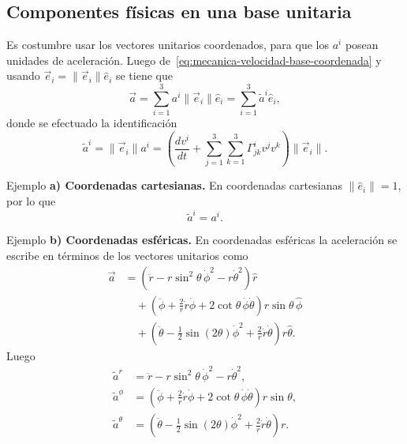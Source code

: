 \documentclass[../apunte_mecanica_clasica.tex]{subfiles}%
\begin{document}
\subsection{Componentes físicas en una base unitaria}

Es costumbre usar los vectores unitarios coordenados, para que los $a^i$ posean unidades de aceleración. Luego de~\eqref{eq:mecanica-velocidad-base-coordenada} y usando $\vec e_i=\|\vec e_i\|\hat e_i$ se tiene que
\begin{equation*}
    \vec a=\sum_{i=1}^{3}a^i\|\vec e_i\|\hat e_i=\sum_{i=1}^{3}\widetilde a^i\hat e_i,
\end{equation*}
donde se efectuado la identificación
\begin{equation}
    \widetilde a^i=\|\vec e_i\|a^i
    =\left(\frac{dv^i}{dt}+\sum_{j=1}^{3}\sum_{k=1}^{3}\Gamma^{i}_{jk}v^jv^k\right)\|\vec e_i\|.
    \label{eq:mecanica-componentes-aceleracion-unitaria}
\end{equation}

\begin{apuntebloque}{Ejemplo}
\textbf{a) Coordenadas cartesianas.} En coordenadas cartesianas $\|\hat e_i\|=1$, por lo que
\begin{equation*}
    \widetilde a^i=a^i.
\end{equation*}
\end{apuntebloque}

\begin{apuntebloque}{Ejemplo}
\textbf{b) Coordenadas esféricas.} En coordenadas esféricas la aceleración se escribe en términos de los vectores unitarios como
\begin{align*}
    \vec a
    &=\left(\ddot r-r\sin^2\theta\,\dot\phi^2-r\dot\theta^2\right)\hat r \\
    &\quad+
    \left(\ddot\phi+\frac{2}{r}\dot r\dot\phi+2\cot\theta\,\dot\phi\dot\theta\right)r\sin\theta\,\hat\phi \\
    &\quad+
    \left(\ddot\theta-\frac{1}{2}\sin(2\theta)\dot\phi^2+\frac{2}{r}\dot r\dot\theta\right)r\hat\theta.
\end{align*}
Luego
\begin{align*}
    \widetilde a^r&=\ddot r-r\sin^2\theta\,\dot\phi^2-r\dot\theta^2,\\
    \widetilde a^\phi&=\left(\ddot\phi+\frac{2}{r}\dot r\dot\phi+2\cot\theta\,\dot\phi\dot\theta\right)r\sin\theta,\\
    \widetilde a^\theta&=\left(\ddot\theta-\frac{1}{2}\sin(2\theta)\dot\phi^2+\frac{2}{r}\dot r\dot\theta\right)r.
\end{align*}
\end{apuntebloque}
\end{document}
